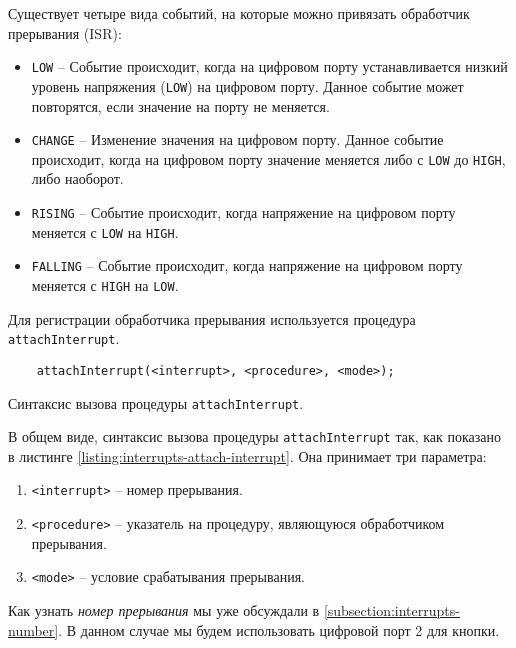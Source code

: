 \documentclass[../sparc.tex]{subfiles}
\begin{document}
Существует четыре вида событий, на которые можно привязать обработчик прерывания
(\gls{ISR}):
\begin{itemize}
\item \texttt{LOW} -- Событие происходит, когда на цифровом порту
  устанавливается низкий уровень напряжения (\texttt{LOW}) на цифровом
  порту.  Данное событие может повторятся, если значение на порту не меняется.
\item \texttt{CHANGE} -- Изменение значения на цифровом порту.  Данное
  событие происходит, когда на цифровом порту значение меняется либо с
  \texttt{LOW} до \texttt{HIGH}, либо наоборот.
\item \texttt{RISING} -- Событие происходит, когда напряжение на
  цифровом порту меняется с \texttt{LOW} на \texttt{HIGH}.
\item \texttt{FALLING} -- Событие происходит, когда напряжение на
  цифровом порту меняется с \texttt{HIGH} на \texttt{LOW}.
\end{itemize}

Для регистрации обработчика прерывания используется процедура
\texttt{attachInterrupt}.

\begin{listing}[H]
  \begin{verbatim}
    attachInterrupt(<interrupt>, <procedure>, <mode>);
  \end{verbatim}
  \caption{Синтаксис вызова процедуры \texttt{attachInterrupt}.}
  \label{listing:interrupts-attach-interrupt}
\end{listing}

В общем виде, синтаксис вызова процедуры \texttt{attachInterrupt} так,
как показано в листинге \ref{listing:interrupts-attach-interrupt}.  Она
принимает три параметра:
\begin{enumerate}
\item \texttt{<interrupt>} -- номер прерывания.
\item \texttt{<procedure>} -- указатель на процедуру, являющуюся
  обработчиком прерывания.
\item \texttt{<mode>} -- условие срабатывания прерывания.
\end{enumerate}

Как узнать \emph{номер прерывания} мы уже обсуждали в
\ref{subsection:interrupts-number}.  В данном случае мы будем использовать
цифровой порт 2 для кнопки.
\end{document}
